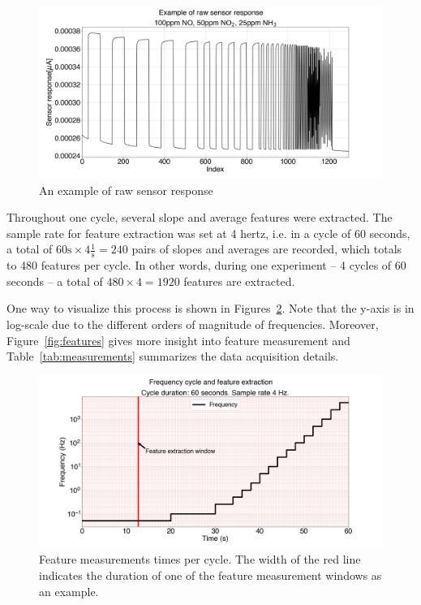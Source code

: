 \begin{figure}[!htb]
	\centering
	\includegraphics[width=1\textwidth]{../figures/raw-response.png}
	\caption{An example of raw sensor response}
	\label{fig:raw}
\end{figure}

Throughout one cycle, several slope and average features were extracted. The sample rate for feature extraction was set at 4 \acrshort{hertz}, i.e. in a cycle of 60 seconds, a total of $60 \text{s} \times 4 \frac{1}{\text{s}} = 240$ pairs of slopes and averages are recorded, which totals to 480 features per cycle. In other words, during one experiment --  4 cycles of 60 seconds -- a total of $480 \times 4 = 1920$ features are extracted. 

One way to visualize this process is shown in Figures~\ref{fig:feat-window}. Note that the y-axis is in log-scale due to the different orders of magnitude of frequencies. Moreover, Figure~\ref{fig:features} gives more insight into feature measurement and Table~\ref{tab:measurements} summarizes the data acquisition details.

\begin{figure}[!htb]
	\centering
	\includegraphics[width=1\textwidth]{../figures/measurement-windows.png}
	
	\caption{Feature measurements times per cycle. The width of the red line indicates the duration of one of the feature measurement windows as an example.}
	\label{fig:feat-window}
\end{figure} 

